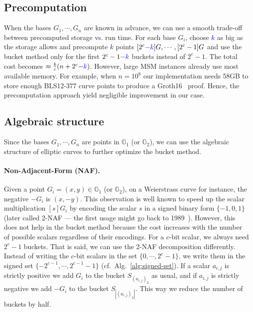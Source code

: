 \documentclass[journal=tches,spthm]{iacrtrans}
\newcommand{\G}{\ensuremath{\mathbb G}}
\newcommand{\BLS}{\ensuremath{\mathrm{BLS}}}
\begin{document}
\subsection{Precomputation}
When the bases $G_1, \cdots, G_n$ are known in advance, we can use a smooth
trade-off between precomputed storage vs. run time. For each base $G_i$, choose
\textcolor{blue}{$k$} as big as the storage allows and precompute
\textcolor{blue}{$k$} points $[2^c \textcolor{blue}{-k}]G, \cdots, [2^c-1]G$
and use the bucket method only for the first $2^c-1\textcolor{blue}{-k}$
buckets instead of $2^c-1$.  The total cost becomes $\approx
\frac{b}{c}(n+2^c\textcolor{blue}{-k})$. However, large MSM instances already
use most available memory. For example, when $n=10^8$ our implementation needs
58GB to store enough \BLS12-377 curve points to produce a Groth16~\cite{EC:Groth16} proof. Hence,
the precomputation approach yield negligible improvement in our case.

\subsection{Algebraic structure}
Since the bases $G_1, \cdots, G_n$ are points in $\G_1$ (or $\G_2$), we can use
the algebraic structure of elliptic curves to further optimize the bucket
method.

\paragraph{Non-Adjacent-Form (NAF).}
Given a point $G_i=(x,y) \in \G_1$ (or $\G_2$), on a Weierstrass curve for instance, the negative $-G_i$ is
$(x,-y)$. This observation is well known to speed up the scalar multiplication
$[s]G_i$ by encoding the scalar $s$ in a signed binary form $\{-1,0,1\}$ (later
called 2-NAF — the first usage might go back to 1989~\cite{rairo:MorOli90}).
However, this does not help in the bucket method because the cost
increases with the number of possible scalars regardless of their encodings. For a
$c$-bit scalar, we always need $2^c-1$ buckets. That is said, we can use the 2-NAF
decomposition differently. Instead of writing the $c$-bit scalars in the set
$\{0,\cdots,2^c-1\}$, we write them in the signed set
$\{-2^{c-1},\cdots,2^{c-1}-1\}$ (cf.~Alg.~\ref{alg:signed-set}). If a scalar
$a_{i,j}$ is strictly positive we add $G_i$ to the bucket $S_{(a_{i,j})_2}$ as usual, and if
$a_{i,j}$ is strictly negative we add $-G_i$ to the bucket $S_{|(a_{i,j})_2|}$. This way we
reduce the number of buckets by half.
\begin{center}
\end{center}
\end{document}
